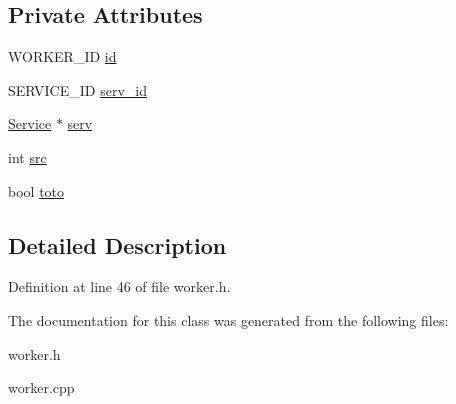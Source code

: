 \subsection*{Private Attributes}
\begin{CompactItemize}
\item 
\hypertarget{classWorker_b5ffcb995e12fa71b9551e91729d6972}{
WORKER\_\-ID \hyperlink{classWorker_b5ffcb995e12fa71b9551e91729d6972}{id}}
\label{classWorker_b5ffcb995e12fa71b9551e91729d6972}

\item 
\hypertarget{classWorker_d7dc76e301fd2bcf5d3a2088a59f1378}{
SERVICE\_\-ID \hyperlink{classWorker_d7dc76e301fd2bcf5d3a2088a59f1378}{serv\_\-id}}
\label{classWorker_d7dc76e301fd2bcf5d3a2088a59f1378}

\item 
\hypertarget{classWorker_454e1764ed165af733cc44a73e395692}{
\hyperlink{classService}{Service} $\ast$ \hyperlink{classWorker_454e1764ed165af733cc44a73e395692}{serv}}
\label{classWorker_454e1764ed165af733cc44a73e395692}

\item 
\hypertarget{classWorker_895c3ebc198018ea3391c09bc802d2f6}{
int \hyperlink{classWorker_895c3ebc198018ea3391c09bc802d2f6}{src}}
\label{classWorker_895c3ebc198018ea3391c09bc802d2f6}

\item 
\hypertarget{classWorker_7ba5a18b2918cf9e704536b763be37f7}{
bool \hyperlink{classWorker_7ba5a18b2918cf9e704536b763be37f7}{toto}}
\label{classWorker_7ba5a18b2918cf9e704536b763be37f7}

\end{CompactItemize}


\subsection{Detailed Description}




Definition at line 46 of file worker.h.

The documentation for this class was generated from the following files:\begin{CompactItemize}
\item 
worker.h\item 
worker.cpp\end{CompactItemize}
